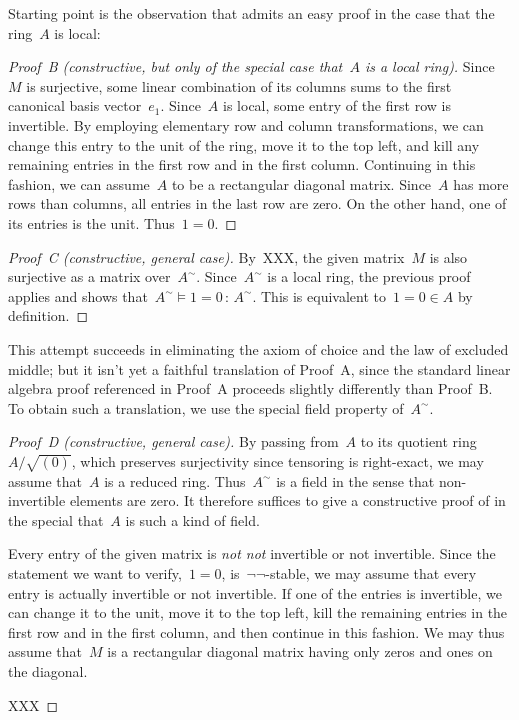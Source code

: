 \documentclass{amsart}
\theoremstyle{definition}
\theoremstyle{plain}
\theoremstyle{remark}
\newcommand{\?}{\,{:}\,}
\newcommand{\notnot}{\emph{not not}\xspace}
\begin{document}
Starting point is the observation that  admits an easy proof
in the case that the ring~$A$ is local:

\begin{proof}[Proof~B (constructive, but only of the special case
that~$A$ is a local ring)]
Since~$M$ is surjective, some linear combination of its columns sums to the
first canonical basis vector~$e_1$. Since~$A$ is local, some entry of the first row
is invertible. By employing elementary row and column transformations, we can
change this entry to the unit of the ring, move it to the top left, and kill
any remaining entries in the first row and in the first column. Continuing in
this fashion, we can assume~$A$ to be a rectangular diagonal matrix. Since~$A$
has more rows than columns, all entries in the last row are zero. On the other
hand, one of its entries is the unit. Thus~$1 = 0$.
\end{proof}

\begin{proof}[Proof~C (constructive, general case)]
By~XXX, the given matrix~$M$ is also surjective as a matrix over~$A^\sim$.
Since~$A^\sim$ is a local ring, the previous proof applies and shows
that~$A^\sim \models 1 = 0 \? A^\sim$. This is equivalent to~$1 = 0 \in A$ by
definition.
\end{proof}

This attempt succeeds in eliminating the axiom of choice and the law of
excluded middle; but it isn't yet a faithful translation of Proof~A, since the
standard linear algebra proof referenced in Proof~A proceeds slightly
differently than Proof~B. To obtain such a translation, we use the special
field property of~$A^\sim$.

\begin{proof}[Proof~D (constructive, general case)]
By passing from~$A$ to its quotient ring~$A/\sqrt{(0)}$, which preserves
surjectivity since tensoring is right-exact, we may assume that~$A$ is a
reduced ring. Thus~$A^\sim$ is a field in the sense that non-invertible
elements are zero. It therefore suffices to give a constructive proof of
 in the special that~$A$ is such a kind of field.

Every entry of the given matrix is \notnot invertible or not invertible. Since
the statement we want to verify,~$1 = 0$, is~$\neg\neg$-stable, we may
assume that every entry is actually invertible or not invertible. If
one of the entries is invertible, we can change it to the unit, move it to the
top left, kill the remaining entries in the first row and in the first
column, and then continue in this fashion. We may thus assume that~$M$ is a
rectangular diagonal matrix having only zeros and ones on the diagonal.

XXX
\end{proof}
\end{document}
